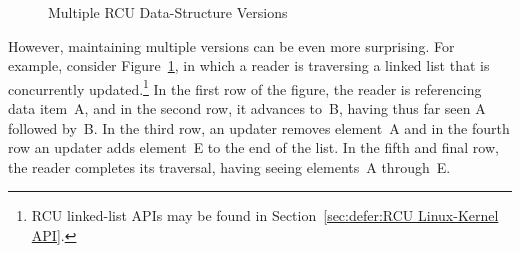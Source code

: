 \begin{figure}[tbp]
\centering
{}
\caption{Multiple RCU Data-Structure Versions}
\label{fig:defer:Multiple RCU Data-Structure Versions}
\end{figure}

However, maintaining multiple versions can be even more surprising.
For example, consider
Figure~\ref{fig:defer:Multiple RCU Data-Structure Versions},
in which a reader is traversing a linked list that is concurrently
updated.\footnote{
	RCU linked-list APIs may be found in
	Section~\ref{sec:defer:RCU Linux-Kernel API}.}
In the first row of the figure, the reader is referencing data item~A,
and in the second row, it advances to~B, having thus far seen A followed by~B\@.
In the third row, an updater removes element~A and in the fourth row
an updater adds element~E to the end of the list.
In the fifth and final row, the reader completes its traversal, having
seeing elements~A through~E\@.

